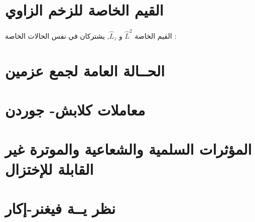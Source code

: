 \section{القيم الخاصة للزخم الزاوي}
القيم الخاصة  
$\hat{L}^{2}$ و $\hat{L}_{z}$, 
يشتركان في نفس الحالات الخاصة :
\section{الحــالة العامة لجمع عزمين}

\section{معاملات كلابش- جوردن}

\section{المؤثرات السلمية والشعاعية والموترة غير القابلة للإختزال}

\section{نظر يــة فيغنر-إكار}


